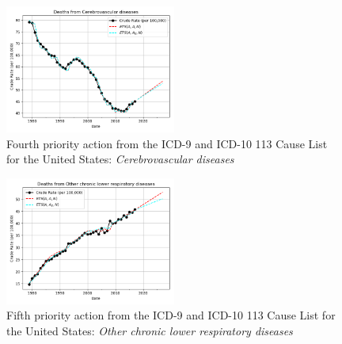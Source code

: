 \documentclass[10pt, a4paper, twocolumn]{IEEEconf}
\begin{document}
\begin{figure}[H]
  \centering
  \includegraphics[width=0.5\textwidth]{results/US_ICD_113_SELECTED_CAUSES_LEAVES/Cerebrovascular_diseases_ets.png}
  \caption{Fourth priority action from the ICD-9 and ICD-10 113 Cause List for the United States: \textit{Cerebrovascular diseases}}\label{fig:k2d}
\end{figure}

\begin{figure}[H]
  \centering
  \includegraphics[width=0.5\textwidth]{results/US_ICD_113_SELECTED_CAUSES_LEAVES/Other_chronic_lower_respiratory_diseases_ets.png}
  \caption{Fifth priority action from the ICD-9 and ICD-10 113 Cause List for the United States: \textit{Other chronic lower respiratory diseases}}\label{fig:k2e}
\end{figure}

\clearpage
\end{document}
